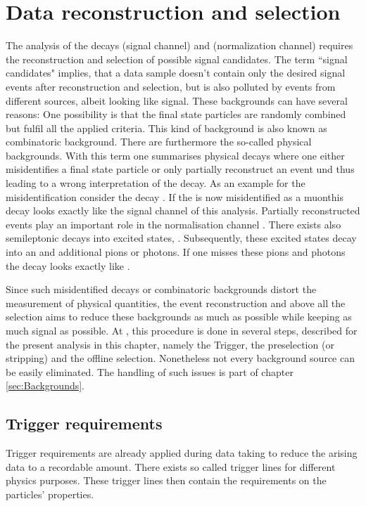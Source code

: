 \chapter{Data reconstruction and selection}
\label{sec:Selection}

The analysis of the decays \LbToDpmunuX (signal channel)  and \LbToLcmunu (normalization channel) requires the reconstruction and selection of possible signal candidates.
The term ``signal candidates" implies, that a data sample doesn't contain only the desired signal events after reconstruction and selection, but is also polluted by events from different sources, albeit looking like signal.
These backgrounds can have several reasons: 
One possibility is that the final state particles are randomly combined but fulfil all the applied criteria. 
This kind of background is also known as combinatoric background.
There are furthermore the so-called physical backgrounds.
With this term one summarises physical decays where one either misidentifies a final state particle or only partially reconstruct an event und thus leading to a wrong interpretation of the decay.
As an example for the misidentification consider the decay \decay{\Lb}{\Dz\proton\pim}. If the \pim is now misidentified as a muonthis decay looks exactly like the signal channel of this analysis.
Partially reconstructed events play an important role in the normalisation channel \LbToLcmunu.
There exists also semileptonic \Lb decays into excited \Lcstar states, \decay{\Lb}{\Lcstar\mun\neumb}.
Subsequently, these excited \Lcstar states decay into an \Lc and additional pions or photons.
If one misses these pions and photons the decay looks exactly like \LbToLcmunu.

Since such misidentified decays or combinatoric backgrounds distort the measurement of physical quantities, the event reconstruction and above all the selection aims to reduce these backgrounds as much as possible while keeping as much signal as possible.
At \lhcb, this procedure is done in several steps, described for the present analysis in this chapter, namely the Trigger, the preselection (or stripping) and the offline selection. 
Nonetheless not every background source can be easily eliminated. 
The handling of such issues is part of chapter \ref{sec:Backgrounds}.

\section{Trigger requirements}
Trigger requirements are already applied during data taking to reduce the arising data to a recordable amount.
There exists so called trigger lines for different physics purposes. 
These trigger lines then contain the requirements on the particles' properties.

